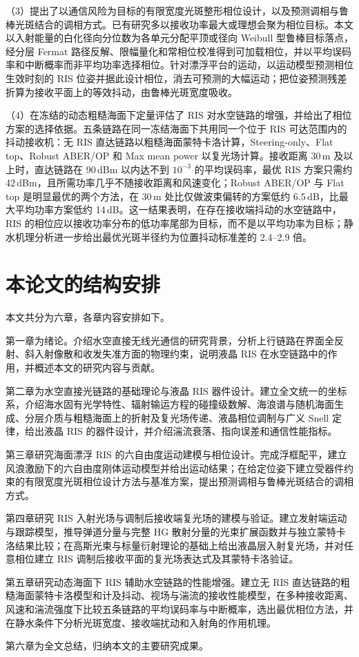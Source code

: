 （3）提出了以通信风险为目标的有限宽度光斑整形相位设计，以及预测调相与鲁棒光斑结合的调相方式。已有研究多以接收功率最大或理想会聚为相位目标。本文以入射能量的白化径向分位数为各单元分配平顶或径向 Weibull 型鲁棒目标落点，经分层 Fermat 路径反解、限幅量化和常相位校准得到可加载相位，并以平均误码率和中断概率而非平均功率选择相位。针对漂浮平台的运动，以运动模型预测相位生效时刻的 RIS 位姿并据此设计相位，消去可预测的大幅运动；把位姿预测残差折算为接收平面上的等效抖动，由鲁棒光斑宽度吸收。

（4）在冻结的动态粗糙海面下定量评估了 RIS 对水空链路的增强，并给出了相位方案的选择依据。五条链路在同一冻结海面下共用同一个位于 RIS 可达范围内的抖动接收机：无 RIS 直达链路以粗糙海面蒙特卡洛计算，Steering-only、Flat top、Robust ABER/OP 和 Max mean power 以复光场计算。接收距离 30\,m 及以上时，直达链路在 90\,dBm 以内达不到 $10^{-3}$ 的平均误码率，最优 RIS 方案只需约 42\,dBm，且所需功率几乎不随接收距离和风速变化；Robust ABER/OP 与 Flat top 是明显最优的两个方法，在 30\,m 处比仅做波束偏转的方案低约 6.5\,dB，比最大平均功率方案低约 14\,dB。这一结果表明，在存在接收端抖动的水空链路中，RIS 的相位应以接收功率分布的低功率尾部为目标，而不是以平均功率为目标；静水机理分析进一步给出最优光斑半径约为位置抖动标准差的 2.4--2.9 倍。

\section{本论文的结构安排}

本文共分为六章，各章内容安排如下。

第一章为绪论。介绍水空直接无线光通信的研究背景，分析上行链路在界面全反射、斜入射像散和收发失准方面的物理约束，说明液晶 RIS 在水空链路中的作用，并概述本文的研究内容与贡献。

第二章为水空直接光链路的基础理论与液晶 RIS 器件设计。建立全文统一的坐标系，介绍海水固有光学特性、辐射输运方程的碰撞级数解、海浪谱与随机海面生成、分层介质与粗糙海面上的折射及复光场传递、液晶相位调制与广义 Snell 定律，给出液晶 RIS 的器件设计，并介绍湍流衰落、指向误差和通信性能指标。

第三章研究海面漂浮 RIS 的六自由度运动建模与相位设计。完成浮框配平，建立风浪激励下的六自由度刚体运动模型并给出运动结果；在给定位姿下建立受器件约束的有限宽度光斑相位设计方法与基准方案，提出预测调相与鲁棒光斑结合的调相方式。

第四章研究 RIS 入射光场与调制后接收端复光场的建模与验证。建立发射端运动与跟踪模型，推导弹道分量与完整 HG 散射分量的光束扩展函数并与独立蒙特卡洛结果比较；在高斯光束与标量衍射理论的基础上给出液晶层入射复光场，并对任意相位建立 RIS 调制后接收平面的复光场表达式及其蒙特卡洛验证。

第五章研究动态海面下 RIS 辅助水空链路的性能增强。建立无 RIS 直达链路的粗糙海面蒙特卡洛模型和计及抖动、视场与湍流的接收性能模型，在多种接收距离、风速和湍流强度下比较五条链路的平均误码率与中断概率，选出最优相位方法，并在静水条件下分析光斑宽度、接收端扰动和入射角的作用机理。

第六章为全文总结，归纳本文的主要研究成果。
